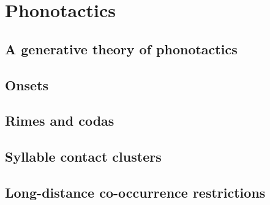 \chapter{Phonotactics}

\citet{Sommerstein1974}

\section{A generative theory of phonotactics}

\section{Onsets}

\section{Rimes and codas}

\section{Syllable contact clusters}

\citet{Haugen1956}

\section{Long-distance co-occurrence restrictions}
